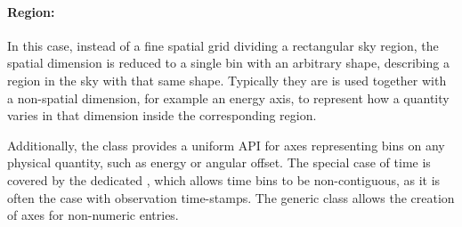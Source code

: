 \paragraph{Region:} In this case, instead of a fine spatial grid
dividing a rectangular sky region, the spatial dimension is reduced to a single
bin with an arbitrary shape, describing a region in the sky with that same
shape. Typically they are is used together with a non-spatial dimension, for
example an energy axis, to represent how a quantity varies in that dimension
inside the corresponding region.

Additionally, the  class provides a uniform API for axes representing
bins on any physical quantity, such as energy or angular offset. The special
case of time is covered by the dedicated , which allows time bins to
be non-contiguous, as it is often the case with observation time-stamps. The
generic class  allows the creation of axes for non-numeric
entries.
